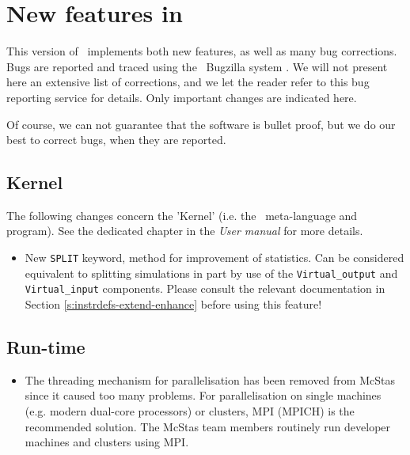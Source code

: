 
\chapter{New features in \MCS\ \version\ }
\label{c:changes}

This version of \MCS\ implements both new features, as well as many bug corrections. Bugs are reported and traced using the \MCS\ Bugzilla system \cite{mczilla_webpage}. We will not present here an extensive list of corrections, and we let the reader refer to this bug reporting service for details. Only important changes are indicated here.

Of course, we can not guarantee that the software is bullet proof, but we do our best to correct bugs, when they are reported.


\section{Kernel}
\label{s:new-features:kernel}

The following changes concern the 'Kernel' (i.e. the \MCS\ meta-language and program). See the dedicated chapter in the {\it User manual} for more details.

\begin{itemize}
\item New \verb+SPLIT+ keyword, method for improvement of statistics. Can be considered equivalent to splitting
  simulations in part by use of the \verb+Virtual_output+ and \verb+Virtual_input+ components. Please consult the
  relevant documentation in Section \ref{s:instrdefs-extend-enhance} before using this feature!
\end{itemize}

\section{Run-time}
\label{s:new-features:run-time}

\begin{itemize}
\item The threading mechanism for parallelisation has been removed from McStas since it caused too many problems. For 
  parallelisation on single machines (e.g. modern dual-core processors) or clusters, MPI (MPICH) is the recommended solution.
  The McStas team members routinely run developer machines and clusters using MPI.
\end{itemize}



